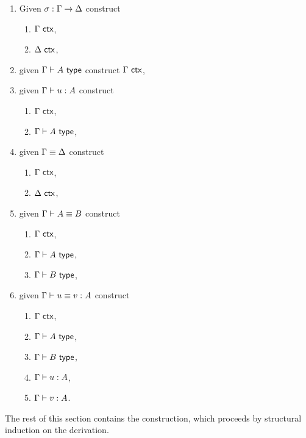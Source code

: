 \begin{problem}
  \leavevmode
  \begin{enumerate}
  \item \label{sane-issubst} Given $\sigma : \Gamma \to \Delta$ construct
    \begin{enumerate}
    \item $\Gamma\ \mathsf{ctx}$,
    \item $\Delta\ \mathsf{ctx}$,
    \end{enumerate}
  \item \label{sane-istype}  given $\Gamma \vdash A \ \mathsf{type}$ construct $\Gamma\ \mathsf{ctx}$,
  \item \label{sane-isterm}  given $\Gamma \vdash u : A$ construct
    \begin{enumerate}
    \item $\Gamma\ \mathsf{ctx}$,
    \item $\Gamma \vdash A \ \mathsf{type}$,
    \end{enumerate}
  \item \label{sane-eqctx}   given $\Gamma \equiv \Delta$ construct
    \begin{enumerate}
    \item $\Gamma\ \mathsf{ctx}$,
    \item $\Delta\ \mathsf{ctx}$,
    \end{enumerate}
  \item \label{sane-eqtype}  given $\Gamma \vdash A \equiv B$ construct
    \begin{enumerate}
    \item $\Gamma\ \mathsf{ctx}$,
    \item $\Gamma \vdash A \ \mathsf{type}$,
    \item $\Gamma \vdash B \ \mathsf{type}$,
    \end{enumerate}
  \item \label{sane-eqterm}  given $\Gamma \vdash u \equiv v : A$ construct
    \begin{enumerate}
    \item $\Gamma\ \mathsf{ctx}$,
    \item $\Gamma \vdash A \ \mathsf{type}$,
    \item $\Gamma \vdash B \ \mathsf{type}$,
    \item $\Gamma \vdash u : A$,
    \item $\Gamma \vdash v : A$.
    \end{enumerate}
  \end{enumerate}
\end{problem}
%
The rest of this section contains the construction, which proceeds by structural induction on the
derivation.


